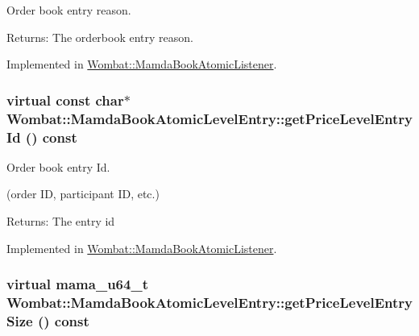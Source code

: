 Order book entry reason. 

\begin{Desc}
\item[Returns:]The orderbook entry reason. \end{Desc}


Implemented in \hyperlink{classWombat_1_1MamdaBookAtomicListener_b7643da89cf38905b17b2bb8a2930f53}{Wombat::Mamda\-Book\-Atomic\-Listener}.\hypertarget{classWombat_1_1MamdaBookAtomicLevelEntry_38c3e2bffcc1bce4ff9453e278141d13}{
\subsubsection[getPriceLevelEntryId]{\setlength{\rightskip}{0pt plus 5cm}virtual const char$\ast$ Wombat::Mamda\-Book\-Atomic\-Level\-Entry::get\-Price\-Level\-Entry\-Id () const}}
\label{classWombat_1_1MamdaBookAtomicLevelEntry_38c3e2bffcc1bce4ff9453e278141d13}


Order book entry Id. 

(order ID, participant ID, etc.)

\begin{Desc}
\item[Returns:]The entry id \end{Desc}


Implemented in \hyperlink{classWombat_1_1MamdaBookAtomicListener_fde019fedeb06b7edcb5dbad7cb2b598}{Wombat::Mamda\-Book\-Atomic\-Listener}.\hypertarget{classWombat_1_1MamdaBookAtomicLevelEntry_1c086ffcdec385808fc04a111eddf1d0}{
\subsubsection[getPriceLevelEntrySize]{\setlength{\rightskip}{0pt plus 5cm}virtual mama\_\-u64\_\-t Wombat::Mamda\-Book\-Atomic\-Level\-Entry::get\-Price\-Level\-Entry\-Size () const}}
\label{classWombat_1_1MamdaBookAtomicLevelEntry_1c086ffcdec385808fc04a111eddf1d0}


